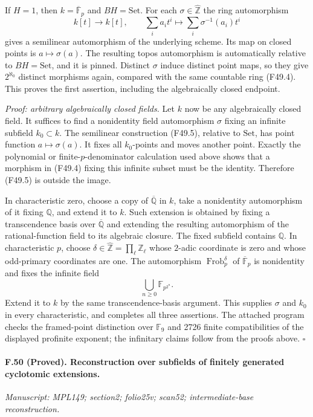 If $H=1$, then $k=\overline{\mathbb F}_p$ and $BH=\mathrm{Set}$.
For each $\sigma\in\widehat{\mathbb Z}$ the ring automorphism
\[
 k[t]\longrightarrow k[t],\qquad
    \sum_i a_i t^i\longmapsto\sum_i\sigma^{-1}(a_i)t^i
                                                               \tag{F49.5}
\]
gives a semilinear automorphism of the underlying scheme.
Its map on closed points is $a\mapsto\sigma(a)$.
The resulting topos automorphism is automatically relative to
$BH=\mathrm{Set}$, and it is pinned. Distinct $\sigma$ induce
distinct point maps, so they give $2^{\aleph_0}$ distinct morphisms
again, compared with the same countable ring (F49.4). This proves
the first assertion, including the algebraically closed endpoint.

\emph{Proof: arbitrary algebraically closed fields.}
Let $k$ now be any algebraically closed field. It suffices to find
a nonidentity field automorphism $\sigma$ fixing an infinite subfield
$k_0\subset k$. The semilinear construction (F49.5), relative to
$\mathrm{Set}$, has point function $a\mapsto\sigma(a)$. It fixes
all $k_0$-points and moves another point. Exactly the polynomial or
finite-$p$-denominator calculation used above shows that a morphism
in (F49.4) fixing this infinite subset must be the identity.
Therefore (F49.5) is outside the image.

In characteristic zero, choose a copy of $\overline{\mathbb Q}$ in
$k$, take a nonidentity automorphism of it fixing $\mathbb Q$, and
extend it to $k$. Such extension is obtained by fixing a
transcendence basis over $\overline{\mathbb Q}$ and extending the
resulting automorphism of the rational-function field to its
algebraic closure. The fixed subfield contains $\mathbb Q$.
In characteristic $p$, choose
$\delta\in\widehat{\mathbb Z}=\prod_\ell\mathbb Z_\ell$ whose
$2$-adic coordinate is zero and whose odd-primary coordinates are
one. The automorphism $\operatorname{Frob}_p^\delta$ of
$\overline{\mathbb F}_p$ is nonidentity and fixes the infinite field
\[
                    \bigcup_{n\geq0}\mathbb F_{p^{2^n}}.
\]
Extend it to $k$ by the same transcendence-basis argument. This
supplies $\sigma$ and $k_0$ in every characteristic, and completes
all three assertions. The attached program 
checks the framed-point distinction over $\mathbb F_9$ and 2726 finite
compatibilities of the displayed profinite exponent; the infinitary
claims follow from the proofs above. \hfill$\square$

\paragraph{F.50 (Proved). Reconstruction over subfields of finitely generated cyclotomic extensions.}
\textit{Manuscript: MPL149; section2; folio25v; scan52; intermediate-base reconstruction.}

